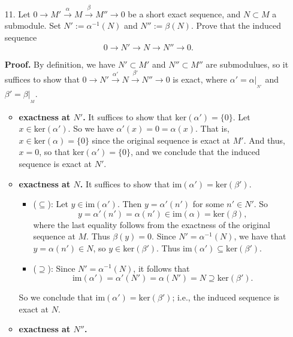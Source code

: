 \documentclass[9pt]{article}
\begin{document}
\begin{enumerate}
   \item[11.]  Let $0 \rightarrow M' \stackrel{\alpha}{\longrightarrow} M
               \stackrel{\beta}{\longrightarrow} M'' \rightarrow 0$ be a
               short exact sequence, and $N \subset M$ a submodule. Set
               $N' := \alpha^{-1}(N)$ and $N'' := \beta(N)$. Prove that the
               induced sequence
               $$0 \rightarrow N' \rightarrow N \rightarrow N'' \rightarrow 0.$$

      \textbf{Proof.} By definition, we have $N' \subset M'$ and
      $N'' \subset M''$ are submodulues, so it suffices to show that
      $0 \rightarrow N' \stackrel{\alpha'}{\longrightarrow} N
      \stackrel{\beta'}{\longrightarrow}N'' \rightarrow 0$ is exact, where
      $\alpha' = \alpha|_{_{N'}}$ and $\beta' = \beta|_{_{M}}$.

      \begin{itemize}
         \item \textbf{exactness at $N'$.} It suffices to show that
               $\text{ker}(\alpha') = \{0\}$. Let $x \in \text{ker}(\alpha')$.
               So we have $\alpha'(x) = 0 = \alpha(x)$. That is,
               $x \in \text{ker}(\alpha) = \{0\}$ since the original sequence is
               exact at $M'$. And thus, $x = 0$, so that
               $\text{ker}(\alpha') = \{0\}$, and we conclude that the induced
               sequence is exact at $N'$.
         \item \textbf{exactness at $N$.} It suffices to show that
               $\text{im}(\alpha') = \text{ker}(\beta')$.
               \begin{itemize}
                  \item ($\subseteq$): Let $y \in \text{im}(\alpha')$. Then
                        $y = \alpha'(n')$ for some $n' \in N'$. So
                        $$y = \alpha'(n') = \alpha(n') \in \text{im}(\alpha) =
                         \text{ker}(\beta),$$
                        where the last equality follows from the exactness of
                        the original sequence at $M$. Thus $\beta(y) = 0$. Since
                        $N' = \alpha^{-1}(N)$, we have that
                        $y = \alpha(n') \in N$, so $y \in \text{ker}(\beta')$.
                        Thus $\text{im}(\alpha') \subseteq \text{ker}(\beta')$.
                  \item ($\supseteq$): Since $N' = \alpha^{-1}(N)$, it follows
                        that
                        $$\text{im}(\alpha') = \alpha'(N') = \alpha(N') = N
                          \supseteq \text{ker}(\beta').$$
               \end{itemize}
               So we conclude that $\text{im}(\alpha') = \text{ker}(\beta')$;
               i.e., the induced sequence is exact at $N$.
         \item \textbf{exactness at $N''$.}
      \end{itemize}
                
\end{enumerate}
\end{document}
